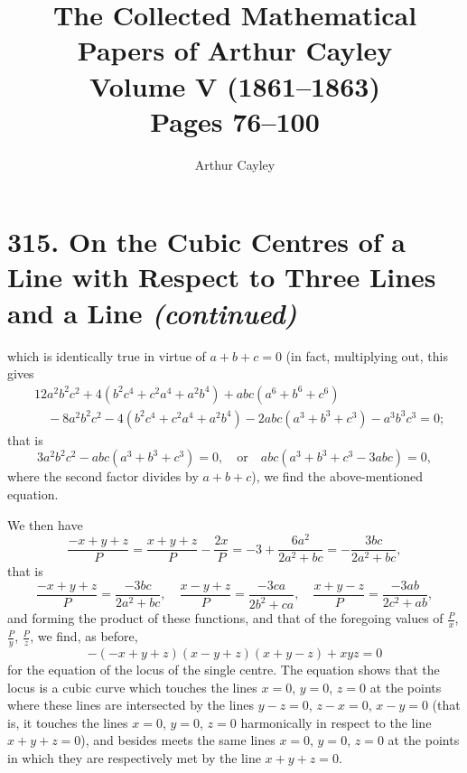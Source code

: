 \documentclass[11pt,a4paper]{article}
\title{\textbf{The Collected Mathematical Papers of Arthur Cayley}\\[6pt]
\Large Volume V (1861--1863)\\[12pt]
\large Pages 76--100}
\author{Arthur Cayley}
\date{}
\theoremstyle{plain}
\begin{document}
\maketitle
\thispagestyle{empty}
\newpage
\setcounter{page}{76}



\section*{315. On the Cubic Centres of a Line with Respect to Three Lines and a Line \textit{(continued)}}


\medskip

\noindent which is identically true in virtue of $a + b + c = 0$ (in fact, multiplying out, this gives
\begin{align*}
&12a^2b^2c^2 + 4(b^2c^4 + c^2a^4 + a^2b^4) + abc(a^6 + b^6 + c^6) \\
&\quad - 8a^2b^2c^2 - 4(b^2c^4 + c^2a^4 + a^2b^4) - 2abc(a^3 + b^3 + c^3) - a^3b^3c^3 = 0;
\end{align*}
that is
\[
3a^2b^2c^2 - abc(a^3 + b^3 + c^3) = 0, \quad \text{or} \quad abc(a^3 + b^3 + c^3 - 3abc) = 0,
\]
where the second factor divides by $a + b + c$), we find the above-mentioned equation.

We then have
\[
\frac{-x + y + z}{P} = \frac{x + y + z}{P} - \frac{2x}{P} = -3 + \frac{6a^2}{2a^2 + bc} = -\frac{3bc}{2a^2 + bc},
\]
that is
\[
\frac{-x + y + z}{P} = \frac{-3bc}{2a^2 + bc}, \quad \frac{x - y + z}{P} = \frac{-3ca}{2b^2 + ca}, \quad \frac{x + y - z}{P} = \frac{-3ab}{2c^2 + ab},
\]
and forming the product of these functions, and that of the foregoing values of $\frac{P}{x}$, $\frac{P}{y}$, $\frac{P}{z}$, we find, as before,
\[
-(-x + y + z)(x - y + z)(x + y - z) + xyz = 0
\]
for the equation of the locus of the single centre. The equation shows that the locus is a cubic curve which touches the lines $x = 0$, $y = 0$, $z = 0$ at the points where these lines are intersected by the lines $y - z = 0$, $z - x = 0$, $x - y = 0$ (that is, it touches the lines $x = 0$, $y = 0$, $z = 0$ harmonically in respect to the line $x + y + z = 0$), and besides meets the same lines $x = 0$, $y = 0$, $z = 0$ at the points in which they are respectively met by the line $x + y + z = 0$.
\end{document}
